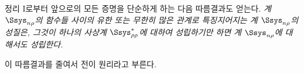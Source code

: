 
정리 I로부터 앞으로의 모든 증명을 단순하게 하는 다음 따름결과도 얻는다. \emph{계 $\Ssys_{n\rho}$의 함수들 사이의 유한 또는 무한히 많은 관계로 특징지어지는 계 $\Ssys_{n\rho}$의 성질은, 그것이 하나의 사상계 $\Ssys^*_{\rho\rho}$에 대하여 성립하기만 하면 계 $\Ssys_{n\rho}$에 대해서도 성립한다.}

이 따름결과를 줄여서 \glqq{}전이 원리\grqq{}라고 부른다.
